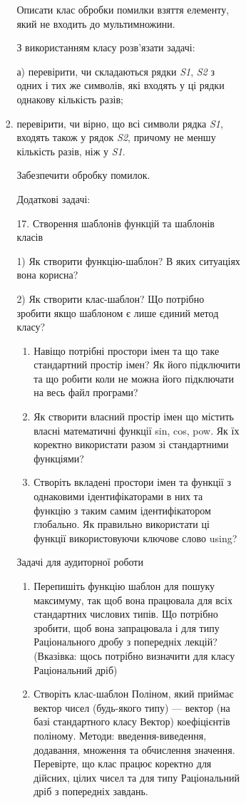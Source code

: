 \documentclass[]{article}
\makeatletter
\newcommand{\xslalph}[1]{\expandafter\@xslalph\csname c@#1\endcsname}
\newcommand{\@xslalph}[1]{%
    \ifcase#1\or а\or б\or в\or г\or д\or e\or є\or ж\or з\or i%
    \or й\or к\or л\or м\or н\or о\or п\or р\or с\or т%
    \or у\or ф\or х\or ц\or ч\or ш\or ю\or я\or аа\or бб\or вв%
    \else\@ctrerr\fi%
}
\makeatother
\begin{document}
\begin{enumerate}
\begin{enumerate}[label=\xslalph*)]
\begin{enumerate}
\begin{enumerate}[label=\xslalph*)]
\begin{enumerate}
\begin{enumerate}[label=\xslalph*)]
\begin{enumerate}
\begin{enumerate}[label=\xslalph*)]
Описати клас обробки помилки взяття елементу, який не входить до
мультимножини.

З використанням класу розв'язати задачі:

а) перевірити, чи складаються рядки \emph{S1}, \emph{S2} з одних і тих
же символів, які входять у ці рядки однакову кількість разів;
\item перевірити, чи вірно, що всі символи рядка \emph{S1}, входять також у
рядок \emph{S2}, причому не меншу кількість разів, ніж у \emph{S1}.

Забезпечити обробку помилок.

Додаткові задачі:

17. Створення шаблонів функцій та шаблонів класів

1) Як створити функцію-шаблон? В яких ситуаціях вона корисна?

2) Як створити клас-шаблон? Що потрібно зробити якщо шаблоном є лише
єдиний метод класу?

\begin{enumerate}
\def\labelenumi{\arabic{enumi})}
\item
  Навіщо потрібні простори імен та що таке стандартний простір імен? Як
  його підключити та що робити коли не можна його підключати на весь
  файл програми?
\item
  Як створити власний простір імен що містить власні математичні функції
  sin, cos, pow. Як їх коректно використати разом зі стандартними
  функціями?
\item
  Створіть вкладені простори імен та функції з однаковими
  ідентифікаторами в них та функцію з таким самим ідентифікатором
  глобально. Як правильно використати ці функції використовуючи ключове
  слово using?
\end{enumerate}

Задачі для аудиторної роботи

\begin{enumerate}
\def\labelenumi{\arabic{enumi})}
\item
  Перепишіть функцію шаблон для пошуку максимуму, так щоб вона працювала
  для всіх стандартних числових типів. Що потрібно зробити, щоб вона
  запрацювала і для типу Раціонального дробу з попередніх лекцій?
  (Вказівка: щось потрібно визначити для класу Раціональний дріб)
\item
  Створіть клас-шаблон Поліном, який приймає вектор чисел (будь-якого
  типу) --- вектор (на базі стандартного класу Вектор) коефіцієнтів
  поліному. Методи: введення-виведення, додавання, множення та
  обчислення значення. Перевірте, що клас працює коректно для дійсних,
  цілих чисел та для типу Раціональний дріб з попередніх завдань.
\end{enumerate}


\end{enumerate}
\end{enumerate}
\end{enumerate}
\end{enumerate}
\end{enumerate}
\end{enumerate}
\end{enumerate}
\end{enumerate}
\end{document}
